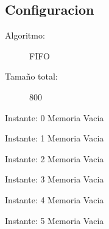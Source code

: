 \documentclass[10pt,a4paper]{article}
\begin{document}
\begin{center}
\section*{Configuracion}
\begin{description}
\item[Algoritmo:] FIFO 
\item[Tamaño total:] 800 
\end{description}
\end{center}
\begin{center}
Instante: 0
Memoria Vacia\\
\end{center}

\begin{center}
Instante: 1
Memoria Vacia\\
\end{center}

\begin{center}
Instante: 2
Memoria Vacia\\
\end{center}

\begin{center}
Instante: 3
Memoria Vacia\\
\end{center}

\begin{center}
Instante: 4
Memoria Vacia\\
\end{center}

\begin{center}
Instante: 5
Memoria Vacia\\
\end{center}
\end{document}
